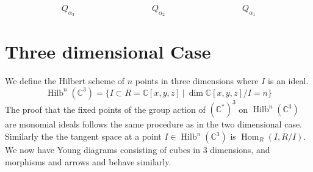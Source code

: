 \documentclass[a4page]{article}
\def\Ker{\operatorname{Ker}}
\def\Hilb{\operatorname{Hilb}}
\def\Hom{\operatorname{Hom}}
\newtheorem{lemma}{Lemma}[section]
\theoremstyle{definition}
\begin{document}
$$ Q_{\alpha_{3}} \quad \quad \quad \quad \quad \quad \quad \quad \quad Q_{\alpha_{2}} \quad \quad \quad \quad \quad \quad \quad \quad \quad Q_{\alpha_{1}} $$



\newpage



\newpage

\section{Three dimensional Case}
We define the Hilbert scheme of $n$ points in three dimensions where $I$ is an ideal.
$$ \Hilb^{n}(\mathbb{C}^{3}) = \{ I \subset R = \mathbb{C}[x,y,z] \ | \ \dim \mathbb{C}[x,y,z]/I = n \} $$
The proof that the fixed points of the group action of $ (\mathbb{C}^{*})^{3} $ on $ \Hilb^{n}(\mathbb{C}^{3})$ are monomial ideals follows the same procedure as in the two dimensional case.
Similarly the the tangent space at a point $I \in \Hilb^{n}(\mathbb{C}^{3})$ is $ \Hom_{R}(I,R/I)$.
We now have Young diagrams consisting of cubes in 3 dimensions, and morphisms and arrows and behave similarly.
\end{document}
